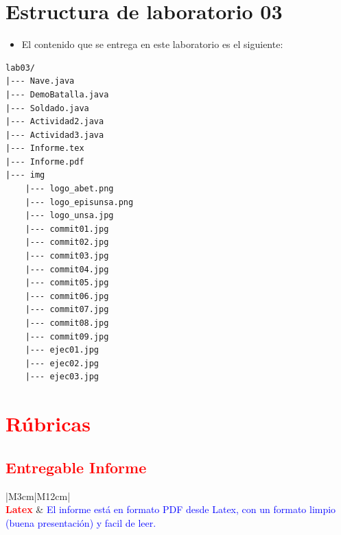 \documentclass{article}
\newcommand{\itemPracticeNumber}{03}
\begin{document}
\section{Estructura de laboratorio \itemPracticeNumber}
\begin{itemize}
	\item El contenido que se entrega en este laboratorio es el siguiente:
\end{itemize}

\begin{lstlisting}[style=ascii-tree]
lab03/
|--- Nave.java
|--- DemoBatalla.java
|--- Soldado.java
|--- Actividad2.java
|--- Actividad3.java
|--- Informe.tex
|--- Informe.pdf
|--- img
	|--- logo_abet.png
	|--- logo_episunsa.png
	|--- logo_unsa.jpg
	|--- commit01.jpg
	|--- commit02.jpg
	|--- commit03.jpg
	|--- commit04.jpg
	|--- commit05.jpg
	|--- commit06.jpg
	|--- commit07.jpg
	|--- commit08.jpg
	|--- commit09.jpg
	|--- ejec01.jpg
	|--- ejec02.jpg
	|--- ejec03.jpg
\end{lstlisting}
\pagebreak

\section{\textcolor{red}{Rúbricas}}

\subsection{\textcolor{red}{Entregable Informe}}
\begin{table}[H]
	\caption{Tipo de Informe}
	\setlength{\tabcolsep}{0.5em} %
	{\renewcommand{\arraystretch}{1.5}%
		\begin{tabular}{|M{3cm}|M{12cm}|}
			\hline
			                                                                                                      \\
			\hline
			\textbf{\textcolor{red}{Latex}} & \textcolor{blue}{El informe está en formato PDF desde Latex,  con un formato limpio (buena presentación) y facil de leer.} \\
			\hline
		\end{tabular}
	}
\end{table}
\end{document}
